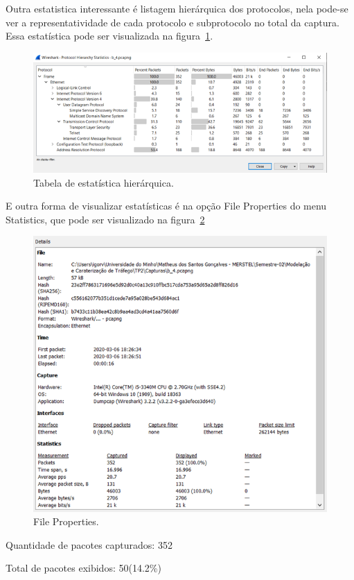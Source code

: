 \documentclass{llncs}
\begin{document}
\begin{enumerate}[\textbf{d)}]
    \begin{flushleft}
      \par Outra estatistica interessante é listagem hierárquica dos protocolos, nela pode-se ver a representatividade de cada protocolo e subprotocolo no total da captura. Essa estatística pode ser visualizada na figura~\ref{fig:statistic}.
      \begin{figure}[h]
        \includegraphics[scale=0.65]{statistic.png}
        \centering
        \caption{Tabela de estatística hierárquica.}
        \label{fig:statistic}
      \end{figure}
    \end{flushleft}

    \begin{flushleft}
      \par E outra forma de visualizar estatísticas é na opção File Properties do menu Statistics, que pode ser visualizado na figura~\ref{fig:details}
      \begin{figure}[h]
        \includegraphics[scale=0.65]{details.png}
        \centering
        \caption{File Properties.}
        \label{fig:details}
      \end{figure}
      \par Quantidade de pacotes capturados: 352
      \par Total de pacotes exibidos: 50(14.2\%)
    \end{flushleft}

  \end{enumerate}
\end{document}
